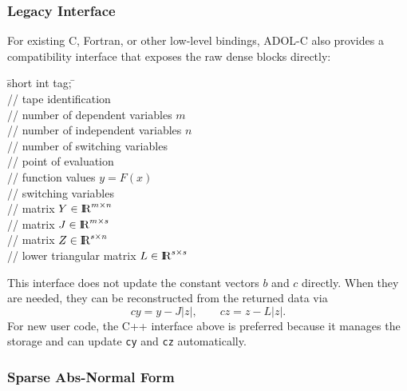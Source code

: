 \subsubsection{Legacy Interface}

For existing C, Fortran, or other low-level bindings, ADOL-C also provides a
compatibility interface that exposes the raw dense blocks directly:
\begin{tabbing}
\hspace{0.5in}\={\sf short int tag;} \hspace{1.1in}\= \kill    %
\\
         \> // tape identification \\
                 \> // number of dependent variables $m$\\
                 \> // number of independent variables $n$\\
                 \> // number of switching variables\\
       \> // point of evaluation\\
           \> // function values $y=F(x)$\\
           \> // switching variables\\
            \> // matrix $Y \in { {\rm I} \kern -.225em {\rm R} }^{m\times n}$\\
            \> // matrix $J \in { {\rm I} \kern -.225em {\rm R} }^{m\times s}$\\
            \> // matrix $Z \in { {\rm I} \kern -.225em {\rm R} }^{s\times n}$\\
            \> // lower triangular matrix $L \in { {\rm I} \kern -.225em {\rm R} }^{s\times s}$\\
\end{tabbing}

This interface does not update the constant vectors $b$ and $c$ directly.
When they are needed, they can be reconstructed from the returned data via
\[
  cy = y - J|z|,
  \qquad
  cz = z - L|z|.
\]
For new user code, the C++ interface above is preferred because it manages the
storage and can update \texttt{cy} and \texttt{cz} automatically.

\subsubsection{Sparse Abs-Normal Form}


